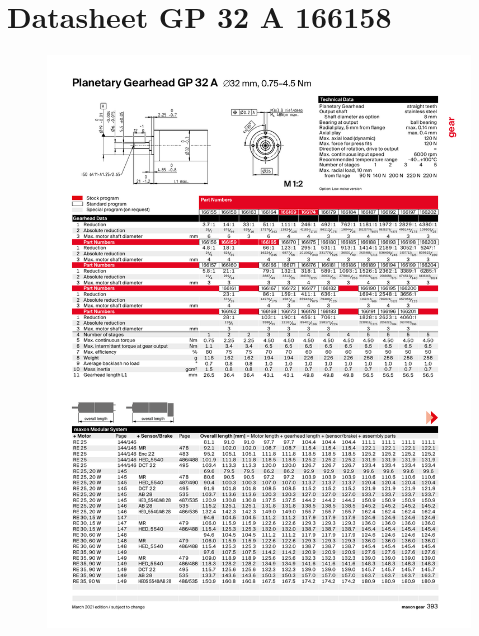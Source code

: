 \documentclass{article}
\begin{document}
  \section{Datasheet GP 32 A 166158}
    \label{app:datasheet transmissie}
    \begin{figure}[htbp]
      \centering %
      \includegraphics[page=1, clip, trim=0cm 0cm 0cm 0cm, scale = 0.65]{datasheet Planetary Gearhead GP 32 A 166158.pdf}
    \end{figure}
    \cite{Maxon}
\end{document}
